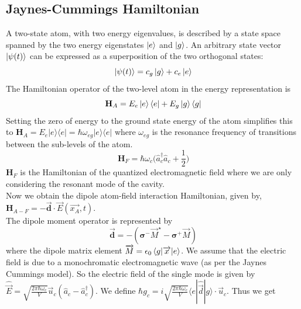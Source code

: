 \documentclass[%
 reprint,
 amsmath,amssymb,
 aps,
]{revtex4-2}
\begin{document}
\subsection{Jaynes-Cummings Hamiltonian}
A two-state atom, with two energy eigenvalues, is described by a state space spanned by the two energy eigenstates $\ket{e}$ and $\ket{g}$. An arbitrary state vector $\ket{\psi(t)}$ can be expressed as a superposition of the two orthogonal states:
\begin{equation}
    \ket{\psi(t)}= c_g\ket{g}+c_e\ket{e}
\end{equation}
The Hamiltonian operator of the two-level atom in the energy representation is
\begin{equation}
    \textbf{H}_A=E_e\ket{e}\bra{e}+E_g\ket{g}\bra{g}
\end{equation}
Setting the zero of energy to the ground state energy of the atom simplifies this to ${\displaystyle {\textbf{H}}_A=E_{e}|e\rangle \langle e|=\hbar \omega _{eg}|e\rangle \langle e|}$ where ${\displaystyle \omega _{eg}}$ is the resonance frequency of transitions between the sub-levels of the atom.
\begin{equation}
    {\displaystyle {\textbf{H}}_{F}=\hbar \omega _{c}{\Bigg (}{\hat {a}}_{c}^{\dagger }{\hat {a}}_{c}+{\frac {1}{2}}{\Bigg )}}
\end{equation}
$\textbf{H}_{F}$ is the Hamiltonian of the quantized electromagnetic field where we are only considering the resonant mode of the cavity.\\
Now we obtain the dipole atom-field interaction Hamiltonian, given by, $\textbf{H}_{A-F}=-\overrightarrow{\textbf{d}}\cdot\overrightarrow{E}(\overrightarrow{x_A},t)$.\\
The dipole moment operator is represented by
\begin{equation}
    \overrightarrow{\textbf{d}}=-(\boldsymbol{\sigma^-}\overrightarrow{M}^\star-\boldsymbol{\sigma^+}\overrightarrow{M})
\end{equation}
where the dipole matrix element $\overrightarrow{M}=\epsilon_0\braket{g|\overrightarrow{x}|e}$.
We assume that the electric field is due to a monochromatic electromagnetic wave (as per the Jaynes Cummings model). So the electric field of the single mode is given by  ${\displaystyle {\hat {\vec {E}}}={\sqrt {\frac {2\pi \hbar \omega _{c}}{V}}}{\vec {u}}_{c }\left({\hat {a}}_{c }-{\hat {a}}_{c }^{\dagger }\right)}$. We define ${\displaystyle \hbar g_{c }=i{\sqrt {\frac {2\pi \hbar \omega _{c}}{V}}}\langle e|{\hat {\vec {d}}}|g\rangle \cdot {\vec {u}}_{c }}$. Thus we get
\end{document}
